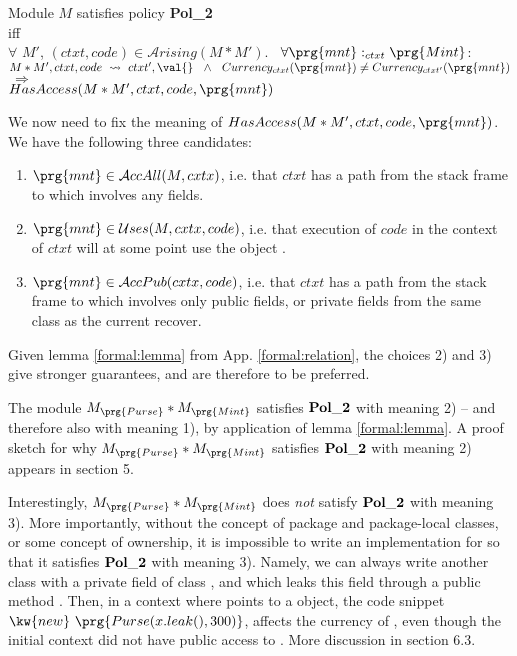  
 
\begin{shaded}
\begin{center}
Module $M$ satisfies policy {\bf Pol\_2} \\ iff \\ $\forall$  $M'$, $(ctxt,code)\in{\mathcal A}rising(M*M')$. \ 
 $\forall \prg{mnt}:_{ctxt} \prg{Mint}$:\\
$ M*M', ctxt, code \ \leadsto \ ctxt', \val{} \ \ \wedge \  \ Currency_{ctxt}(\prg{mnt})\neq Currency_{ctxt'}(\prg{mnt})$
\\
$ \ \Rightarrow\ $
\\
$HasAccess(M*M',ctxt,code,\prg{mnt})$
 \end{center}
\end{shaded}

\noindent
 We now need to fix the meaning of $HasAccess(M*M',ctxt,code,\prg{mnt})$. We have the following three candidates:
  
  \begin{enumerate}
    \item  $ \in {\mathcal A}ccAll(M, cxtx)$, i.e. that  $ctxt$ has a path from the stack frame to  which involves any fields. 
\item $\prg{mnt}  \in {\mathcal U}ses(M, cxtx, code)$, i.e. that execution of $code$ in the context of $ctxt$ will at some point use  the object . 
  \item $\prg{mnt} \in {\mathcal A}ccPub( cxtx, code)$, i.e. that  $ctxt$ has a path from the stack frame to \prg{mnt} which involves only public fields, or private fields from the same class  as the current recover.
    \end{enumerate}
    
  Given lemma \ref{formal:lemma} from App. \ref{formal:relation}, the choices 2) and 3)  give  stronger guarantees, and are therefore to be preferred.  
  
  The module $M_{\prg{Purse}}*M_{{\prg{Mint}}}$  satisfies ${\bf Pol\_2}$ with  meaning 2) -- and therefore also with meaning 1), by application of lemma 
 \ref{formal:lemma}. A proof sketch for why $M_{\prg{Purse}}*M_{{\prg{Mint}}}$  satisfies ${\bf Pol\_2}$ with  meaning 2) appears
  in section 5.
  
   Interestingly, $M_{}*M_{{\prg{Mint}}}$  does {\em not} satisfy ${\bf Pol\_2}$ with  meaning 3). More importantly, without the concept of package and package-local classes, or some concept of ownership, it is impossible to write an implementation for {\prg{Purse}} so that it satisfies
   ${\bf Pol\_2}$ with  meaning 3). Namely, we can always write another class {\prg{Cheat}} with a private field \prg{myMint} of class {\prg{Mint}}, and which leaks this field through a public method \prg{leak}. Then, in a context where \prg{x} points to a  {\prg{Cheat}} object, the code snippet $\kw{new}\ \prg{Purse(x.leak(),300)}$, affects the currency of , even though the initial context did not have public access to .
  More discussion in section 6.3.
  
